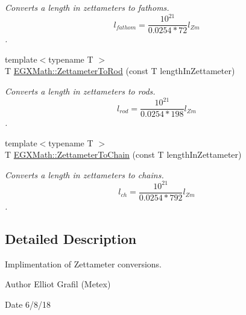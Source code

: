 \begin{DoxyCompactItemize}
\begin{DoxyCompactList}\small\item\em Converts a length in zettameters to fathoms. \[ l_{fathom}= \frac{10^{21}}{0.0254 * 72} l_{Zm} \]. \end{DoxyCompactList}\item 
{\footnotesize template$<$typename T $>$ }\\T \mbox{\hyperlink{group___e_g_x_math-_conversions-_length_conversions-_s_i-_zettameter-_surveyors_gac9031bf1465b8a56ab426ac20d256741}{E\+G\+X\+Math\+::\+Zettameter\+To\+Rod}} (const T length\+In\+Zettameter)
\begin{DoxyCompactList}\small\item\em Converts a length in zettameters to rods. \[ l_{rod}= \frac{10^{21}}{0.0254 * 198} l_{Zm} \]. \end{DoxyCompactList}\item 
{\footnotesize template$<$typename T $>$ }\\T \mbox{\hyperlink{group___e_g_x_math-_conversions-_length_conversions-_s_i-_zettameter-_surveyors_ga97af95fc842ded65d430a539ef8a3571}{E\+G\+X\+Math\+::\+Zettameter\+To\+Chain}} (const T length\+In\+Zettameter)
\begin{DoxyCompactList}\small\item\em Converts a length in zettameters to chains. \[ l_{ch}= \frac{10^{21}}{0.0254 * 792} l_{Zm} \]. \end{DoxyCompactList}\end{DoxyCompactItemize}


\subsection{Detailed Description}
Implimentation of Zettameter conversions. 

\begin{DoxyAuthor}{Author}
Elliot Grafil (Metex) 
\end{DoxyAuthor}
\begin{DoxyDate}{Date}
6/8/18 
\end{DoxyDate}
